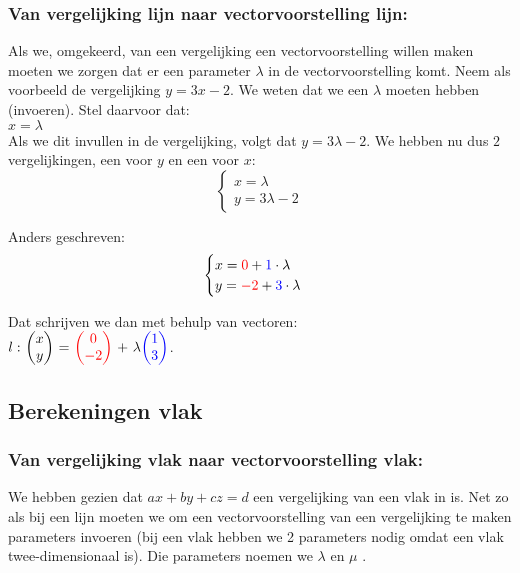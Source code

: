\subsubsection{Van vergelijking lijn naar vectorvoorstelling lijn:}
Als we, omgekeerd, van een vergelijking een vectorvoorstelling willen maken moeten we zorgen dat er een parameter $ \lambda $ in de vectorvoorstelling komt. Neem als voorbeeld de vergelijking $ y = 3x - 2 $. We weten dat we een $ \lambda $ moeten hebben (invoeren). Stel daarvoor dat: \\
$ x =  \lambda $ \\
Als we dit invullen in de vergelijking, volgt dat $y = 3\lambda - 2$. We hebben nu dus $2$ vergelijkingen, een voor $y$ en een voor $x$:
\[\begin{cases}
x = \lambda \\
y = 3\lambda - 2 
\end{cases}
\] 

Anders geschreven: 
\[\begin{cases}
  x = {\color{red}0}  + {\color{blue}1}\cdot \lambda \\
  y = {\color{red}-2} + {\color{blue}3}\cdot \lambda 
\end{cases}
\] 


Dat schrijven we dan met behulp van vectoren: \\ 
$ l: \  \vectwee {x}{y} \ = \ \vectwee[red] {0}{-2} \ +\  \lambda  \vectwee[blue] {1}{3}  $.\\
%

\newpage
\subsection{Berekeningen vlak}
\subsubsection{Van vergelijking vlak naar vectorvoorstelling vlak:}
We hebben gezien dat $ ax + by + cz = d $ een vergelijking van een vlak in \RD is. Net zo als bij een lijn moeten we om een vectorvoorstelling van een vergelijking te maken parameters invoeren (bij een vlak hebben we 2 parameters nodig omdat een vlak  twee-dimensionaal is). Die parameters noemen we $ \lambda $  en $ \mu $ . \\

